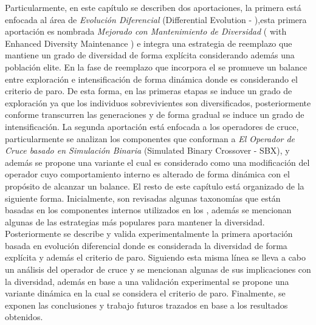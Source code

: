 %
Particularmente, en este capítulo se describen dos aportaciones, la primera está enfocada al área de \textit{Evolución Diferencial} (Differential Evolution - \DE{}),esta primera aportación es nombrada \DE{} \textit{Mejorado con Mantenimiento de Diversidad} (\DE{} with Enhanced Diversity Maintenance \DEEDM{}) e integra una estrategia de reemplazo que mantiene un grado de diversidad de forma explícita considerando además una población elite.
%
En la fase de reemplazo que incorpora el \DEEDM{} se promueve un balance entre exploración e intensificación de forma dinámica donde es considerando el criterio de paro.
%
De esta forma, en las primeras etapas se induce un grado de exploración ya que los individuos sobrevivientes son diversificados, posteriormente conforme transcurren las generaciones y de forma gradual se induce un grado de intensificación.
% 
La segunda aportación está enfocada a los operadores de cruce, particularmente se analizan los componentes que conforman a \textit{El Operador de Cruce basado en Simulación Binaria} (Simulated Binary Crossover - SBX), y además se propone una variante \DSBX{} el cual es considerado como una modificación del operador \SBX{} cuyo comportamiento interno es alterado de forma dinámica con el propósito de alcanzar un balance.
%
El resto de este capítulo está organizado de la siguiente forma.
%
Inicialmente, son revisadas algunas taxonomías que están basadas en los componentes internos utilizados en los \EAS{}, además se mencionan algunas de las estrategias más populares para mantener la diversidad.
%
Posteriormente se describe y valida experimentalmente la primera aportación basada en evolución diferencial donde es considerada la diversidad de forma explícita y además el criterio de paro.
%
Siguiendo esta misma línea se lleva a cabo un análisis del operador de cruce \SBX{} y se mencionan algunas de sus implicaciones con la diversidad, además en base a una validación experimental se propone una variante dinámica en la cual se considera el criterio de paro.
%
Finalmente, se exponen las conclusiones y trabajo futuros trazados en base a los resultados obtenidos.
%

